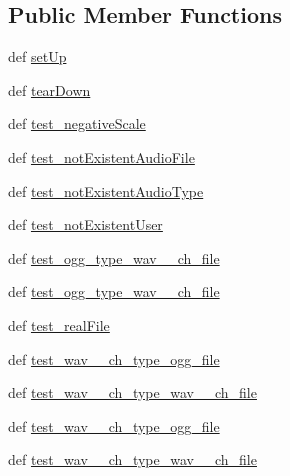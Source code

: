 \subsection*{Public Member Functions}
\begin{DoxyCompactItemize}
\item 
def \hyperlink{classdenoise__unit__tests_1_1TestAudioProcessing_a7de102218fb2997e1ee3eb54f019716b}{set\-Up}
\item 
def \hyperlink{classdenoise__unit__tests_1_1TestAudioProcessing_a0b5ba548d4ed4c51c433e2ec4e3ebe74}{tear\-Down}
\item 
def \hyperlink{classdenoise__unit__tests_1_1TestAudioProcessing_ae1a17e135285902d2d1994b0a3f097b5}{test\-\_\-negative\-Scale}
\item 
def \hyperlink{classdenoise__unit__tests_1_1TestAudioProcessing_abb6cbcda08af0c243a5d561433b32a70}{test\-\_\-not\-Existent\-Audio\-File}
\item 
def \hyperlink{classdenoise__unit__tests_1_1TestAudioProcessing_abef05168d2756e37aed2689423b62402}{test\-\_\-not\-Existent\-Audio\-Type}
\item 
def \hyperlink{classdenoise__unit__tests_1_1TestAudioProcessing_abb7c4de41acad528eb555ffa3f4569a7}{test\-\_\-not\-Existent\-User}
\item 
def \hyperlink{classdenoise__unit__tests_1_1TestAudioProcessing_aa5aa322c8e8c137b2df7abb7b28b8430}{test\-\_\-ogg\-\_\-type\-\_\-wav\-\_\-\_\-ch\-\_\-file}
\item 
def \hyperlink{classdenoise__unit__tests_1_1TestAudioProcessing_a8ab2e76b611895890ba4e5e0894a4437}{test\-\_\-ogg\-\_\-type\-\_\-wav\-\_\-\_\-ch\-\_\-file}
\item 
def \hyperlink{classdenoise__unit__tests_1_1TestAudioProcessing_aec16b59a6ea0211f8fd79d4ca4d68cb4}{test\-\_\-real\-File}
\item 
def \hyperlink{classdenoise__unit__tests_1_1TestAudioProcessing_a0a82f099904bbeec84a9416b5c8b9af6}{test\-\_\-wav\-\_\-\_\-ch\-\_\-type\-\_\-ogg\-\_\-file}
\item 
def \hyperlink{classdenoise__unit__tests_1_1TestAudioProcessing_a9ac397525cbf072a7b5c7507cfc3f850}{test\-\_\-wav\-\_\-\_\-ch\-\_\-type\-\_\-wav\-\_\-\_\-ch\-\_\-file}
\item 
def \hyperlink{classdenoise__unit__tests_1_1TestAudioProcessing_aedebea8664cc5588c78083fd4cb00ffa}{test\-\_\-wav\-\_\-\_\-ch\-\_\-type\-\_\-ogg\-\_\-file}
\item 
def \hyperlink{classdenoise__unit__tests_1_1TestAudioProcessing_a1592faaf83d011ff61520ad7dbac9875}{test\-\_\-wav\-\_\-\_\-ch\-\_\-type\-\_\-wav\-\_\-\_\-ch\-\_\-file}
\end{DoxyCompactItemize}
